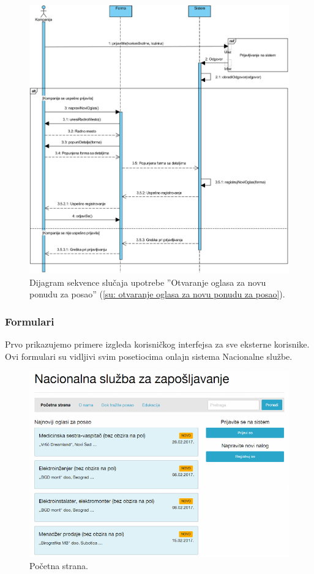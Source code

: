 \begin{figure}[H]
	\centering
	\includegraphics[width=\textwidth]{dijagrami/dijagrami-sekvence/otvaranje-oglasa-za-novu-ponudu-za-posao.png}
	\caption{Dijagram sekvence slu\v caja upotrebe ''Otvaranje oglasa za novu ponudu za posao'' (\ref{su: otvaranje oglasa za novu ponudu za posao}).}
\end{figure}

\newpage
\subsubsection{Formulari}

Prvo prikazujemo primere izgleda korisni\v ckog interfejsa za sve eksterne korisnike. Ovi formulari su vidljivi svim posetiocima onlajn sistema Nacionalne slu\v zbe.

\begin{figure}[H]
	\centering
	\includegraphics[width=\textwidth]{korisnicki-interfejs/slike/index.png}
	\caption{Po\v cetna strana.}
	\label{for: index}
\end{figure}

